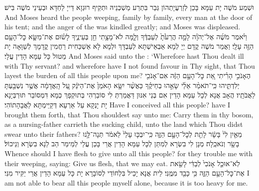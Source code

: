 {וּשְׁמַע מֹשֶׁה יָת עַמָּא בָּכַן לְזַרְעֲיָתְהוֹן גְּבַר בִּתְרַע מַשְׁכְּנֵיהּ וּתְקֵיף רוּגְזָא דַּייָ לַחְדָּא וּבְעֵינֵי מֹשֶׁה בִּישׁ׃}
{And Moses heard the people weeping, family by family, every man at the door of his tent; and the anger of the \lord\space was kindled greatly; and Moses was displeased.}{}
{וַיֹּ֨אמֶר מֹשֶׁ֜ה אֶל־יְהֹוָ֗ה לָמָ֤ה הֲרֵעֹ֙תָ֙ לְעַבְדֶּ֔ךָ וְלָ֛מָּה לֹא־מָצָ֥תִי חֵ֖ן בְּעֵינֶ֑יךָ לָשׂ֗וּם אֶת־מַשָּׂ֛א כׇּל־הָעָ֥ם הַזֶּ֖ה עָלָֽי׃}
{וַאֲמַר מֹשֶׁה קֳדָם יְיָ לְמָא אַבְאֵישְׁתָּא לְעַבְדָּךְ וּלְמָא לָא אַשְׁכַּחִית רַחֲמִין קֳדָמָךְ לְשַׁוָּאָה יָת מַטוּל כָּל עַמָּא הָדֵין עֲלָי׃}
{And Moses said unto the \lord: ‘Wherefore hast Thou dealt ill with Thy servant? and wherefore have I not found favour in Thy sight, that Thou layest the burden of all this people upon me?}{}
{הֶאָנֹכִ֣י הָרִ֗יתִי אֵ֚ת כׇּל־הָעָ֣ם הַזֶּ֔ה אִם־אָנֹכִ֖י יְלִדְתִּ֑יהוּ כִּֽי־תֹאמַ֨ר אֵלַ֜י שָׂאֵ֣הוּ בְחֵיקֶ֗ךָ כַּאֲשֶׁ֨ר יִשָּׂ֤א הָאֹמֵן֙ אֶת־הַיֹּנֵ֔ק עַ֚ל הָֽאֲדָמָ֔ה אֲשֶׁ֥ר נִשְׁבַּ֖עְתָּ לַאֲבֹתָֽיו׃
}
{הֲאָב אֲנָא לְכָל עַמָּא הָדֵין אִם בְּנַי אִנּוּן דַּאֲמַרְתְּ לִי סוֹבַרְהִי בְּתוּקְפָךְ כְּמָא דִּמְסוֹבַר תּוּרְבְּיָנָא יָת יָנְקָא עַל אַרְעָא דְּקַיֵּימְתָּא לַאֲבָהָתוֹהִי׃}
{Have I conceived all this people? have I brought them forth, that Thou shouldest say unto me: Carry them in thy bosom, as a nursing-father carrieth the sucking child, unto the land which Thou didst swear unto their fathers?}{}
{מֵאַ֤יִן לִי֙ בָּשָׂ֔ר לָתֵ֖ת לְכׇל־הָעָ֣ם הַזֶּ֑ה כִּֽי־יִבְכּ֤וּ עָלַי֙ לֵאמֹ֔ר תְּנָה־לָּ֥נוּ בָשָׂ֖ר וְנֹאכֵֽלָה׃}
{מְנָן לִי בִשְׂרָא לְמִתַּן לְכָל עַמָּא הָדֵין אֲרֵי בָּכַן עֲלַי לְמֵימַר הַב לַנָא בִשְׂרָא וְנֵיכוֹל׃}
{Whence should I have flesh to give unto all this people? for they trouble me with their weeping, saying: Give us flesh, that we may eat.}{}
{לֹֽא־אוּכַ֤ל אָנֹכִי֙ לְבַדִּ֔י לָשֵׂ֖את אֶת־כׇּל־הָעָ֣ם הַזֶּ֑ה כִּ֥י כָבֵ֖ד מִמֶּֽנִּי׃}
{לֵית אֲנָא יָכֵיל בִּלְחוֹדַי לְסוֹבָרָא יָת כָּל עַמָּא הָדֵין אֲרֵי יַקִּיר מִנִּי׃}
{I am not able to bear all this people myself alone, because it is too heavy for me.}{}
